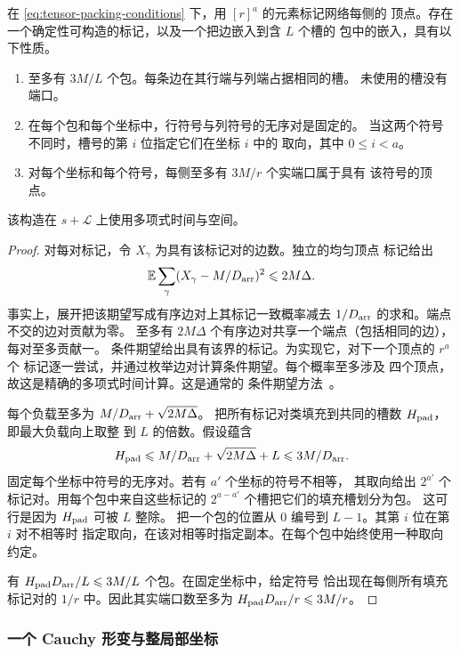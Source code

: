\begin{lemma}[打包成包]\label{lem:tensor-packets}
在 \eqref{eq:tensor-packing-conditions} 下，用 $[r]^a$ 的元素标记网络每侧的
顶点。存在一个确定性可构造的标记，以及一个把边嵌入到含 $L$ 个槽的
包中的嵌入，具有以下性质。
\begin{enumerate}
\item 至多有 $3M/L$ 个包。每条边在其行端与列端占据相同的槽。
      未使用的槽没有端口。
\item 在每个包和每个坐标中，行符号与列符号的无序对是固定的。
      当这两个符号不同时，槽号的第 $i$ 位指定它们在坐标 $i$ 中的
      取向，其中 $0\le i<a$。
\item 对每个坐标和每个符号，每侧至多有 $3M/r$ 个实端口属于具有
      该符号的顶点。
\end{enumerate}
该构造在 $s+\mathcal L$ 上使用多项式时间与空间。
\end{lemma}
\begin{proof}
对每对标记，令 $X_\gamma$ 为具有该标记对的边数。独立的均匀顶点
标记给出
\[
 \mathbb E\sum_\gamma (X_\gamma-M/D_{\rm arr})^2\le2M\Delta.
\]
事实上，展开把该期望写成有序边对上其标记一致概率减去
$1/D_{\rm arr}$ 的求和。端点不交的边对贡献为零。
至多有 $2M\Delta$ 个有序边对共享一个端点（包括相同的边），
每对至多贡献一。
条件期望给出具有该界的标记。为实现它，对下一个顶点的 $r^a$ 个
标记逐一尝试，并通过枚举边对计算条件期望。每个概率至多涉及
四个顶点，故这是精确的多项式时间计算。这是通常的
条件期望方法~\cite{Raghavan88}。

每个负载至多为 $M/D_{\rm arr}+\sqrt{2M\Delta}$。
把所有标记对类填充到共同的槽数 $H_{\rm pad}$，即最大负载向上取整
到 $L$ 的倍数。假设蕴含
\[
 H_{\rm pad}\le M/D_{\rm arr}+\sqrt{2M\Delta}+L
              \le3M/D_{\rm arr}.
\]
固定每个坐标中符号的无序对。若有 $a'$ 个坐标的符号不相等，
其取向给出 $2^{a'}$ 个标记对。用每个包中来自这些标记的
$2^{a-a'}$ 个槽把它们的填充槽划分为包。
这可行是因为 $H_{\rm pad}$ 可被 $L$ 整除。
把一个包的位置从 $0$ 编号到 $L-1$。其第 $i$ 位在第 $i$ 对不相等时
指定取向，在该对相等时指定副本。在每个包中始终使用一种取向约定。

有 $H_{\rm pad}D_{\rm arr}/L\le3M/L$ 个包。在固定坐标中，给定符号
恰出现在每侧所有填充标记对的 $1/r$ 中。因此其实端口数至多为
$H_{\rm pad}D_{\rm arr}/r\le3M/r$。
\end{proof}

\subsubsection{一个 Cauchy 形变与整局部坐标}
\label{subsec:tensor-deformation}

